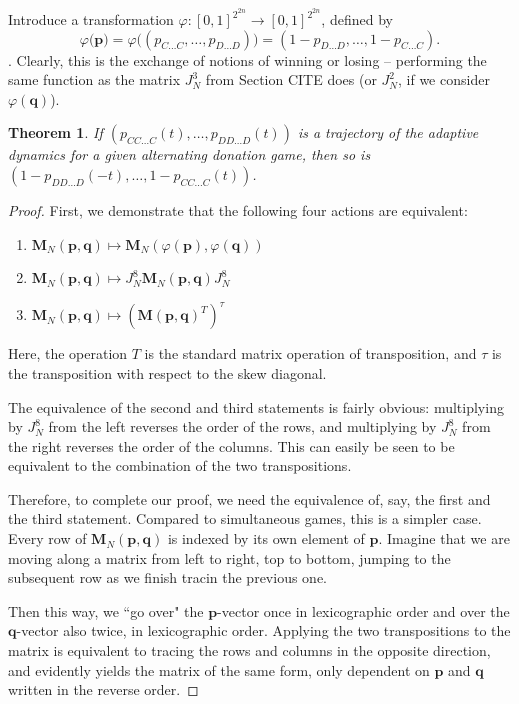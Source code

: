 \documentclass{article}
\def\p{\mathbf{p}}
\def\Mb{\mathbf{M}}
\def\q{\mathbf{q}}
\newtheorem{theorem}{Theorem}[section]
\theoremstyle{definition}
\numberwithin{equation}{section}
\begin{document}
Introduce a transformation $\varphi:[0,1]^{2^{2n}}\rightarrow[0,1]^{2^{2n}}$, defined by
$$\varphi\big( \p \big) = \varphi\big( (p_{C\ldots C},\ldots,p_{D\ldots D})\big) = (1-p_{D\ldots D},\ldots,1\!-\!p_{C\ldots C}).$$. Clearly, this is the exchange of notions of winning or losing -- performing the same function as the matrix $J_N^3$ from Section CITE does (or $J_N^2$, if we consider $\varphi(\q)$).  


\begin{theorem}
If $(p_{CC\ldots C}(t),\ldots, p_{DD\ldots D}(t))$ is a trajectory of the adaptive dynamics for a given alternating donation game, then so is $(1- p_{DD\ldots D}(-t),\ldots, 1-p_{CC\ldots C}(t))$.  
\end{theorem}
\begin{proof}
First, we demonstrate that the following four actions are equivalent:
\begin{enumerate}
  \item  $\Mb_N(\p,\q)\mapsto \Mb_N(\varphi(\p),\varphi(\q))$
    \item $\Mb_N(\p,\q)\mapsto J_N^8\Mb_N(\p,\q)J_N^8$
    \item $\Mb_N(\p,\q)\mapsto (\Mb(\p,\q)^T)^{\tau}$
\end{enumerate}
Here, the operation $T$ is the standard matrix operation of transposition, and $\tau$ is the transposition with respect to the skew diagonal. 

The equivalence of the second and third statements is fairly obvious: multiplying by $J_N^8$ from the left reverses the order of the rows, and multiplying by $J_N^8$ from the right reverses the order of the columns. This can easily be seen to be equivalent to the combination of the two transpositions. 


Therefore, to complete our proof, we need the equivalence of, say, the first and the third statement. Compared to simultaneous games, this is a simpler case. Every row of $\Mb_N(\p,\q)$  is indexed by its own element of $\p$. Imagine that we are moving along a matrix from left to right, top to bottom, jumping to the subsequent row as we finish tracin the previous one. 

Then this way, we ``go over" the $\p$-vector once in lexicographic order and over the $\q$-vector also twice, in lexicographic order. Applying the two transpositions to the matrix is equivalent to tracing the rows and columns in the opposite direction, and evidently yields the matrix of the same form, only dependent on $\p$ and $\q$ written in the reverse order. 


\end{proof}
\end{document}
